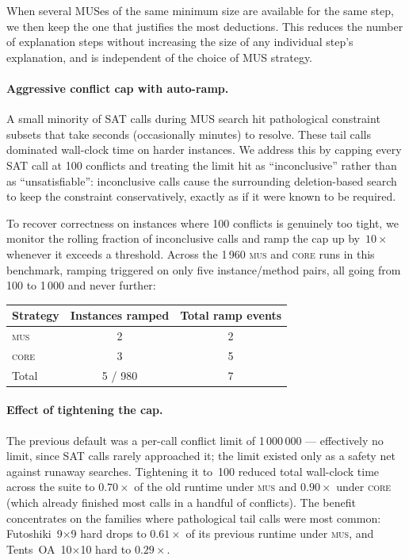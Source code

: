 When several MUSes of the same minimum size are available for the
same step, we then keep the one that justifies the most deductions.
This reduces the number of explanation steps without increasing the
size of any individual step's explanation, and is independent of the
choice of MUS strategy.

\paragraph{Aggressive conflict cap with auto-ramp.}

A small minority of SAT calls during MUS search hit pathological
constraint subsets that take seconds (occasionally minutes) to
resolve.  These tail calls dominated wall-clock time on harder
instances.  We address this by capping every SAT call at 100
conflicts and treating the limit hit as ``inconclusive'' rather than
as ``unsatisfiable'': inconclusive calls cause the surrounding
deletion-based search to keep the constraint conservatively, exactly
as if it were known to be required.

To recover correctness on instances where 100 conflicts is genuinely
too tight, we monitor the rolling fraction of inconclusive calls and
ramp the cap up by~$10\times$ whenever it exceeds a threshold.  Across
the 1\,960 \textsc{mus} and \textsc{core} runs in this benchmark,
ramping triggered on only five instance/method pairs, all going from
100 to 1\,000 and never further:

\begin{table}[h]
\centering
\small
\begin{tabular}{@{}lcc@{}}
\toprule
Strategy & Instances ramped & Total ramp events \\
\midrule
\textsc{mus}   & 2 & 2 \\
\textsc{core}  & 3 & 5 \\
\midrule
Total          & 5 / 980 & 7 \\
\bottomrule
\end{tabular}
\end{table}

\paragraph{Effect of tightening the cap.}

The previous default was a per-call conflict limit of 1\,000\,000 ---
effectively no limit, since SAT calls rarely approached it; the limit
existed only as a safety net against runaway searches.  Tightening it
to~100 reduced total wall-clock time across the suite to $0.70\times$
of the old runtime under \textsc{mus} and $0.90\times$ under
\textsc{core} (which already finished most calls in a handful of
conflicts).  The benefit concentrates on the families where
pathological tail calls were most common: Futoshiki~9$\times$9 hard
drops to $0.61\times$ of its previous runtime under \textsc{mus}, and
Tents~OA~10$\times$10 hard to $0.29\times$.


